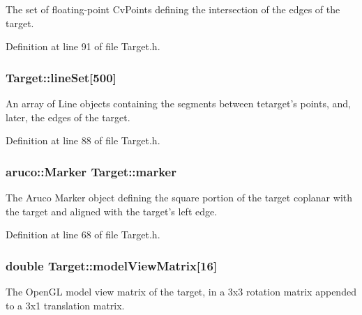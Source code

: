 The set of floating-\/point CvPoints defining the intersection of the edges of the target. 



Definition at line 91 of file Target.h.

\hypertarget{classTarget_af112a6c4b4cb598d27f33332de574680}{
\subsubsection[{lineSet}]{ {\bf Target::lineSet}\mbox{[}500\mbox{]}}}
\label{classTarget_af112a6c4b4cb598d27f33332de574680}


An array of Line objects containing the segments between tetarget's points, and, later, the edges of the target. 



Definition at line 88 of file Target.h.

\hypertarget{classTarget_a631383ffe78165e8af649470edb77986}{
\subsubsection[{marker}]{\setlength{\rightskip}{0pt plus 5cm}aruco::Marker {\bf Target::marker}}}
\label{classTarget_a631383ffe78165e8af649470edb77986}


The Aruco Marker object defining the square portion of the target coplanar with the target and aligned with the target's left edge. 



Definition at line 68 of file Target.h.

\hypertarget{classTarget_acfcc0fcb67b56b407f7842871306c0ae}{
\subsubsection[{modelViewMatrix}]{\setlength{\rightskip}{0pt plus 5cm}double {\bf Target::modelViewMatrix}\mbox{[}16\mbox{]}}}
\label{classTarget_acfcc0fcb67b56b407f7842871306c0ae}


The OpenGL model view matrix of the target, in a 3x3 rotation matrix appended to a 3x1 translation matrix. 



